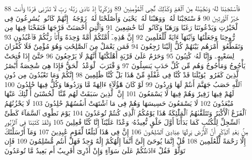 {\tiny\colorbox{cl_aya}{88}} فَٱسْتَجَبْنَا لَهُۥ وَنَجَّيْنَٰهُ مِنَ ٱلْغَمِّ وَكَذَٰلِكَ نُۨجِى ٱلْمُؤْمِنِينَ
{\tiny\colorbox{cl_aya}{89}} وَزَكَرِيَّآ إِذْ نَادَىٰ رَبَّهُۥ رَبِّ لَا تَذَرْنِى فَرْدًا وَأَنتَ خَيْرُ ٱلْوَٰرِثِينَ
{\tiny\colorbox{cl_aya}{90}} فَٱسْتَجَبْنَا لَهُۥ وَوَهَبْنَا لَهُۥ يَحْيَىٰ وَأَصْلَحْنَا لَهُۥ زَوْجَهُۥٓ إِنَّهُمْ كَانُوا۟ يُسَٰرِعُونَ فِى ٱلْخَيْرَٰتِ وَيَدْعُونَنَا رَغَبًا وَرَهَبًا وَكَانُوا۟ لَنَا خَٰشِعِينَ
{\tiny\colorbox{cl_aya}{91}} وَٱلَّتِىٓ أَحْصَنَتْ فَرْجَهَا فَنَفَخْنَا فِيهَا مِن رُّوحِنَا وَجَعَلْنَٰهَا وَٱبْنَهَآ ءَايَةً لِّلْعَٰلَمِينَ
{\tiny\colorbox{cl_aya}{92}} إِنَّ هَٰذِهِۦٓ أُمَّتُكُمْ أُمَّةً وَٰحِدَةً وَأَنَا۠ رَبُّكُمْ فَٱعْبُدُونِ
{\tiny\colorbox{cl_aya}{93}} وَتَقَطَّعُوٓا۟ أَمْرَهُم بَيْنَهُمْ كُلٌّ إِلَيْنَا رَٰجِعُونَ
{\tiny\colorbox{cl_aya}{94}} فَمَن يَعْمَلْ مِنَ ٱلصَّٰلِحَٰتِ وَهُوَ مُؤْمِنٌ فَلَا كُفْرَانَ لِسَعْيِهِۦ وَإِنَّا لَهُۥ كَٰتِبُونَ
{\tiny\colorbox{cl_aya}{95}} وَحَرَٰمٌ عَلَىٰ قَرْيَةٍ أَهْلَكْنَٰهَآ أَنَّهُمْ لَا يَرْجِعُونَ
{\tiny\colorbox{cl_aya}{96}} حَتَّىٰٓ إِذَا فُتِحَتْ يَأْجُوجُ وَمَأْجُوجُ وَهُم مِّن كُلِّ حَدَبٍ يَنسِلُونَ
{\tiny\colorbox{cl_aya}{97}} وَٱقْتَرَبَ ٱلْوَعْدُ ٱلْحَقُّ فَإِذَا هِىَ شَٰخِصَةٌ أَبْصَٰرُ ٱلَّذِينَ كَفَرُوا۟ يَٰوَيْلَنَا قَدْ كُنَّا فِى غَفْلَةٍ مِّنْ هَٰذَا بَلْ كُنَّا ظَٰلِمِينَ
{\tiny\colorbox{cl_aya}{98}} إِنَّكُمْ وَمَا تَعْبُدُونَ مِن دُونِ ٱللَّهِ حَصَبُ جَهَنَّمَ أَنتُمْ لَهَا وَٰرِدُونَ
{\tiny\colorbox{cl_aya}{99}} لَوْ كَانَ هَٰٓؤُلَآءِ ءَالِهَةً مَّا وَرَدُوهَا وَكُلٌّ فِيهَا خَٰلِدُونَ
{\tiny\colorbox{cl_aya}{100}} لَهُمْ فِيهَا زَفِيرٌ وَهُمْ فِيهَا لَا يَسْمَعُونَ
{\tiny\colorbox{cl_aya}{101}} إِنَّ ٱلَّذِينَ سَبَقَتْ لَهُم مِّنَّا ٱلْحُسْنَىٰٓ أُو۟لَٰٓئِكَ عَنْهَا مُبْعَدُونَ
{\tiny\colorbox{cl_aya}{102}} لَا يَسْمَعُونَ حَسِيسَهَا وَهُمْ فِى مَا ٱشْتَهَتْ أَنفُسُهُمْ خَٰلِدُونَ
{\tiny\colorbox{cl_aya}{103}} لَا يَحْزُنُهُمُ ٱلْفَزَعُ ٱلْأَكْبَرُ وَتَتَلَقَّىٰهُمُ ٱلْمَلَٰٓئِكَةُ هَٰذَا يَوْمُكُمُ ٱلَّذِى كُنتُمْ تُوعَدُونَ
{\tiny\colorbox{cl_aya}{104}} يَوْمَ نَطْوِى ٱلسَّمَآءَ كَطَىِّ ٱلسِّجِلِّ لِلْكُتُبِ كَمَا بَدَأْنَآ أَوَّلَ خَلْقٍ نُّعِيدُهُۥ وَعْدًا عَلَيْنَآ إِنَّا كُنَّا فَٰعِلِينَ
{\tiny\colorbox{cl_aya}{105}} وَلَقَدْ كَتَبْنَا فِى ٱلزَّبُورِ مِنۢ بَعْدِ ٱلذِّكْرِ أَنَّ ٱلْأَرْضَ يَرِثُهَا عِبَادِىَ ٱلصَّٰلِحُونَ
{\tiny\colorbox{cl_aya}{106}} إِنَّ فِى هَٰذَا لَبَلَٰغًا لِّقَوْمٍ عَٰبِدِينَ
{\tiny\colorbox{cl_aya}{107}} وَمَآ أَرْسَلْنَٰكَ إِلَّا رَحْمَةً لِّلْعَٰلَمِينَ
{\tiny\colorbox{cl_aya}{108}} قُلْ إِنَّمَا يُوحَىٰٓ إِلَىَّ أَنَّمَآ إِلَٰهُكُمْ إِلَٰهٌ وَٰحِدٌ فَهَلْ أَنتُم مُّسْلِمُونَ
{\tiny\colorbox{cl_aya}{109}} فَإِن تَوَلَّوْا۟ فَقُلْ ءَاذَنتُكُمْ عَلَىٰ سَوَآءٍ وَإِنْ أَدْرِىٓ أَقَرِيبٌ أَم بَعِيدٌ مَّا تُوعَدُونَ
